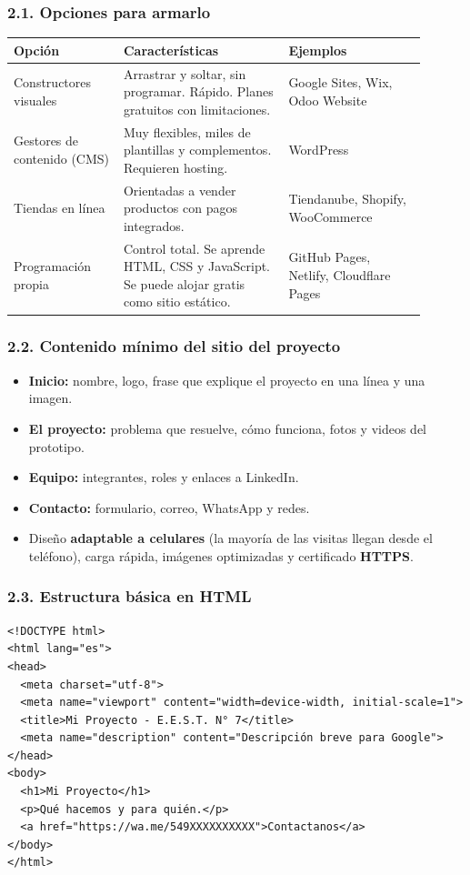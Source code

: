 \subsubsection*{2.1. Opciones para armarlo}
\begin{center}
\small
\begin{tabular}{|p{0.24\linewidth}|p{0.36\linewidth}|p{0.30\linewidth}|}
\hline
\textbf{Opción} & \textbf{Características} & \textbf{Ejemplos} \\ \hline
Constructores visuales & Arrastrar y soltar, sin programar. Rápido. Planes gratuitos con
limitaciones. & Google Sites, Wix, Odoo Website \\ \hline
Gestores de contenido (CMS) & Muy flexibles, miles de plantillas y complementos. Requieren
hosting. & WordPress \\ \hline
Tiendas en línea & Orientadas a vender productos con pagos integrados. & Tiendanube,
Shopify, WooCommerce \\ \hline
Programación propia & Control total. Se aprende HTML, CSS y JavaScript. Se puede alojar
gratis como sitio estático. & GitHub Pages, Netlify, Cloudflare Pages \\ \hline
\end{tabular}
\end{center}

\subsubsection*{2.2. Contenido mínimo del sitio del proyecto}
\begin{itemize}
  \item \textbf{Inicio:} nombre, logo, frase que explique el proyecto en una línea y una imagen.
  \item \textbf{El proyecto:} problema que resuelve, cómo funciona, fotos y videos del prototipo.
  \item \textbf{Equipo:} integrantes, roles y enlaces a LinkedIn.
  \item \textbf{Contacto:} formulario, correo, WhatsApp y redes.
  \item Diseño \textbf{adaptable a celulares} (la mayoría de las visitas llegan desde el
        teléfono), carga rápida, imágenes optimizadas y certificado \textbf{HTTPS}.
\end{itemize}

\subsubsection*{2.3. Estructura básica en HTML}
\begin{verbatim}
<!DOCTYPE html>
<html lang="es">
<head>
  <meta charset="utf-8">
  <meta name="viewport" content="width=device-width, initial-scale=1">
  <title>Mi Proyecto - E.E.S.T. N° 7</title>
  <meta name="description" content="Descripción breve para Google">
</head>
<body>
  <h1>Mi Proyecto</h1>
  <p>Qué hacemos y para quién.</p>
  <a href="https://wa.me/549XXXXXXXXXX">Contactanos</a>
</body>
</html>
\end{verbatim}

